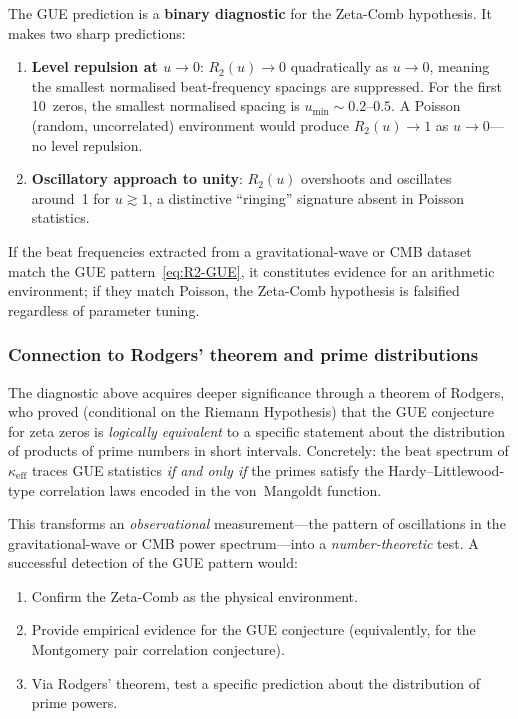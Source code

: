\documentclass[12pt,a4paper]{article}
\begin{document}
The GUE prediction is a \textbf{binary diagnostic} for the
Zeta-Comb hypothesis.  It makes two sharp predictions:
\begin{enumerate}
  \item \textbf{Level repulsion at $u\to 0$}: $R_{2}(u)\to 0$
    quadratically as $u\to 0$, meaning the smallest normalised
    beat-frequency spacings are suppressed.  For the first 10~zeros,
    the smallest normalised spacing is
    $u_{\mathrm{min}}\sim 0.2$--$0.5$.
    A Poisson (random, uncorrelated) environment would produce
    $R_{2}(u)\to 1$ as $u\to 0$---no level repulsion.

  \item \textbf{Oscillatory approach to unity}: $R_{2}(u)$ overshoots
    and oscillates around~1 for $u\gtrsim 1$, a distinctive
    ``ringing'' signature absent in Poisson statistics.
\end{enumerate}

If the beat frequencies extracted from a gravitational-wave or CMB
dataset match the GUE pattern~\eqref{eq:R2-GUE}, it constitutes
evidence for an arithmetic environment; if they match Poisson, the
Zeta-Comb hypothesis is falsified regardless of parameter tuning.

\subsubsection{Connection to Rodgers' theorem and prime
  distributions}\label{sssec:rodgers}

The diagnostic above acquires deeper significance through a theorem of
Rodgers, who proved (conditional on the Riemann
Hypothesis) that the GUE conjecture for zeta zeros is \emph{logically
  equivalent} to a specific statement about the distribution of
products of prime numbers in short intervals.  Concretely: the
beat spectrum of $\kappa_{\mathrm{eff}}$ traces GUE statistics
\emph{if and only if} the primes satisfy the Hardy--Littlewood-type
correlation laws encoded in the von~Mangoldt function.

This transforms an \emph{observational} measurement---the pattern of
oscillations in the gravitational-wave or CMB power spectrum---into a
\emph{number-theoretic} test.  A successful detection of the GUE
pattern would:
\begin{enumerate}
  \item Confirm the Zeta-Comb as the physical environment.
  \item Provide empirical evidence for the GUE conjecture
    (equivalently, for the Montgomery pair correlation conjecture).
  \item Via Rodgers' theorem, test a specific prediction about
    the distribution of prime powers.
\end{enumerate}
\end{document}
